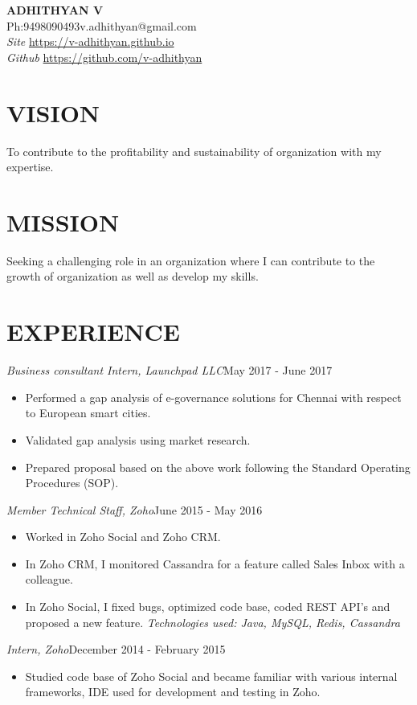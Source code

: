 \documentclass[11pt,a4paper]{article}
\begin{document}
\begin{center}
{\LARGE{\textbf{ADHITHYAN V}}}\\
{Ph:9498090493\hfill}{\hfill v.adhithyan@gmail.com} \\
\emph{Site} \href{https://v-adhithyan.github.io}{https://v-adhithyan.github.io} \\
\emph{Github} \href{https://github.com/v-adhithyan}{https://github.com/v-adhithyan}\\
\noindent\makebox[\linewidth]{\rule{\paperwidth}{0.4pt}}
\end{center}
\begin{multicols}{2}
\section*{VISION}
\par To contribute to the profitability and sustainability of organization with my expertise.
\section*{MISSION}
\par Seeking a challenging role in an organization where I can contribute to the growth of organization as well as develop my skills.
\end{multicols}
\section*{EXPERIENCE}
\emph{Business consultant Intern, Launchpad LLC}{\hfill May 2017 -  June 2017}
\begin{itemize}[noitemsep]
\item Performed a gap analysis of e-governance solutions for Chennai with respect to European smart cities.
\item Validated gap analysis using market research.
\item Prepared proposal based on the above work following the Standard Operating Procedures (SOP).
\end{itemize}
\emph{Member Technical Staff, Zoho}{\hfill June 2015 - May 2016}
\begin{itemize}[noitemsep]
\item Worked in Zoho Social and Zoho CRM.
\item In Zoho CRM, I monitored Cassandra for a feature called Sales Inbox with a colleague.
\item In Zoho Social, I fixed bugs, optimized code base, coded REST API's and proposed a new feature. \emph {Technologies used: Java, MySQL, Redis, Cassandra}
\end{itemize}
\emph{Intern, Zoho}{\hfill December 2014 - February 2015}
\begin{itemize}[noitemsep]
\item Studied code base of Zoho Social and became familiar with various internal frameworks, IDE used for development and testing in Zoho.
\end{itemize}
\end{document}
